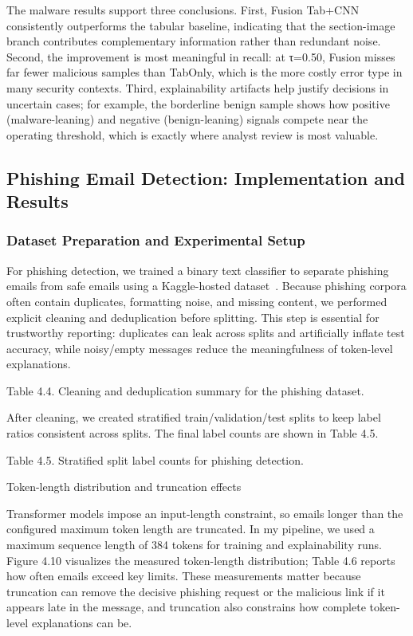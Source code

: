 \documentclass[conference]{IEEEtran}
\begin{document}
The malware results support three conclusions. First, Fusion Tab+CNN consistently outperforms the tabular baseline, indicating that the section-image branch contributes complementary information rather than redundant noise. Second, the improvement is most meaningful in recall: at τ=0.50, Fusion misses far fewer malicious samples than TabOnly, which is the more costly error type in many security contexts. Third, explainability artifacts help justify decisions in uncertain cases; for example, the borderline benign sample shows how positive (malware-leaning) and negative (benign-leaning) signals compete near the operating threshold, which is exactly where analyst review is most valuable.

\subsection{Phishing Email Detection: Implementation and Results}

\subsubsection{Dataset Preparation and Experimental Setup}

For phishing detection, we trained a binary text classifier to separate phishing emails from safe emails using a Kaggle-hosted dataset~\cite{phishingDT}. Because phishing corpora often contain duplicates, formatting noise, and missing content, we performed explicit cleaning and deduplication before splitting. This step is essential for trustworthy reporting: duplicates can leak across splits and artificially inflate test accuracy, while noisy/empty messages reduce the meaningfulness of token-level explanations.

Table 4.4. Cleaning and deduplication summary for the phishing dataset.

After cleaning, we created stratified train/validation/test splits to keep label ratios consistent across splits. The final label counts are shown in Table 4.5.

Table 4.5. Stratified split label counts for phishing detection.

Token-length distribution and truncation effects

Transformer models impose an input-length constraint, so emails longer than the configured maximum token length are truncated. In my pipeline, we used a maximum sequence length of 384 tokens for training and explainability runs. Figure 4.10 visualizes the measured token-length distribution; Table 4.6 reports how often emails exceed key limits. These measurements matter because truncation can remove the decisive phishing request or the malicious link if it appears late in the message, and truncation also constrains how complete token-level explanations can be.
\end{document}
